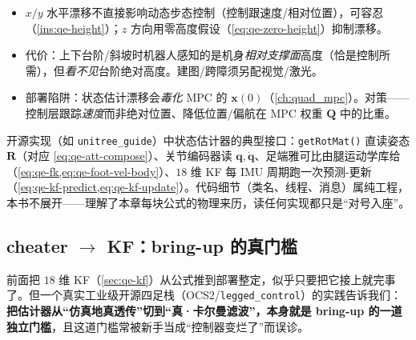 \begin{practice}[高度漂移与零高度假设的部署代价]
\begin{itemize}
  \item $x/y$ 水平漂移不直接影响动态步态控制（控制跟速度/相对位置），可容忍（\cref{ins:qe-height}）；$z$ 方向用零高度假设（\cref{eq:qe-zero-height}）抑制漂移。
  \item 代价：上下台阶/斜坡时机器人感知的是机身\emph{相对支撑面}高度（恰是控制所需），但\emph{看不见}台阶绝对高度。建图/跨障须另配视觉/激光。
  \item 部署陷阱：状态估计漂移会\emph{毒化} MPC 的 $\boldsymbol x(0)$（\cref{ch:quad_mpc}）。对策——控制层跟踪\emph{速度}而非绝对位置、降低位置/偏航在 MPC 权重 $\mathbf{Q}$ 中的比重。
\end{itemize}
\end{practice}

\begin{practice}
开源实现（如 \texttt{unitree\_guide}）中状态估计器的典型接口：\texttt{getRotMat()} 直读姿态 $\mathbf{R}$（对应 \cref{eq:qe-att-compose}）、关节编码器读 $\boldsymbol q,\dot{\boldsymbol q}$、足端雅可比由腿运动学库给（\cref{eq:qe-fk,eq:qe-foot-vel-body}）、$18$ 维 KF 每 IMU 周期跑一次预测-更新（\cref{eq:qe-kf-predict,eq:qe-kf-update}）。代码细节（类名、线程、消息）属纯工程，本书不展开——理解了本章每块公式的物理来历，读任何实现都只是“对号入座”。
\end{practice}

\subsection{cheater \texorpdfstring{$\to$}{->} KF：bring-up 的真门槛}
\label{subsec:qe-cheater-gate}

前面把 $18$ 维 KF（\cref{sec:qe-kf}）从公式推到部署整定，似乎只要把它接上就完事了。但一个真实工业级开源四足栈（OCS2/\texttt{legged\_control}\cite{flayols2017experimental}）的实践告诉我们：\textbf{把估计器从“仿真地真透传”切到“真·卡尔曼滤波”，本身就是 bring-up 的一道独立门槛}，且这道门槛常被新手当成“控制器变烂了”而误诊。

